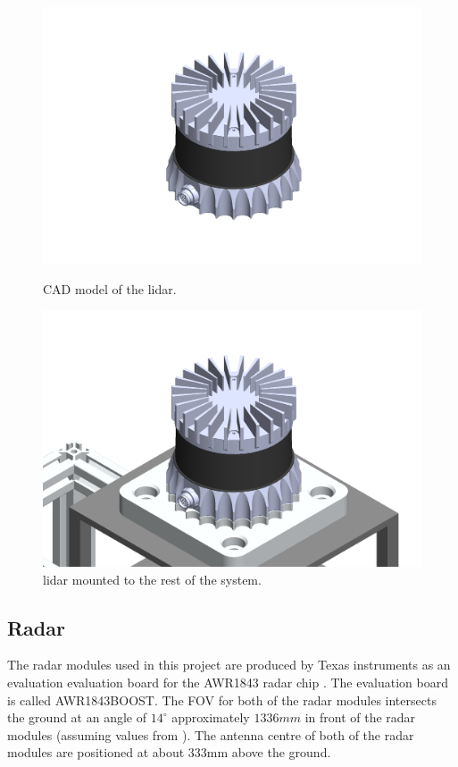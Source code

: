 \begin{figure}[H]
    \centering
    \begin{minipage}[b]{0.49\textwidth}
        \includegraphics[width=\textwidth]{Figures/CAD/lidar.PNG}
        \caption{CAD model of the lidar.}
        \label{fig:lidar}
    \end{minipage}
    \begin{minipage}[b]{0.49\textwidth}
        \includegraphics[width=\textwidth]{Figures/CAD/lidarMounted.PNG}
        \caption{lidar mounted to the rest of the system.}
        \label{fig:lidarMounted}
    \end{minipage}
\end{figure}

\subsection{Radar}\label{subsec:Radar}
The radar modules used in this project are produced by Texas instruments as an evaluation evaluation board for the AWR1843 radar chip \cite{awr1843boost}. The evaluation board is called AWR1843BOOST. The FOV for both of the radar modules intersects the ground at an angle of $14 ^{\circ}$ approximately $1336 mm$ in front of the radar modules (assuming values from \cite{xWR1843EvalModule}). The antenna centre of both of the
radar modules are positioned at about 333mm above the ground.

